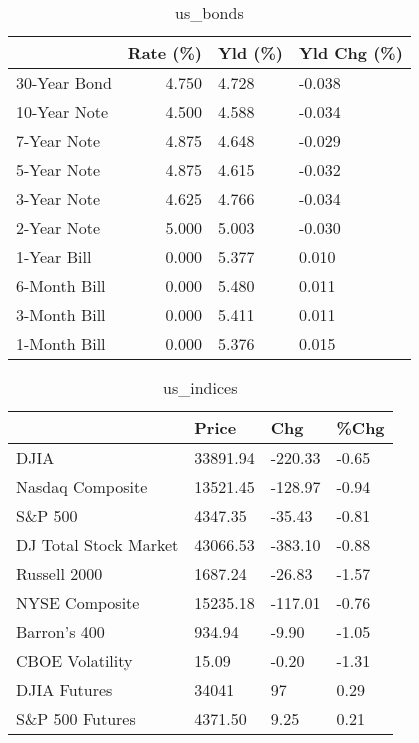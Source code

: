 \documentclass{article}%
\begin{document}
%


\begin{table}[htbp]%
\caption{us\_bonds}%
\centering%
\begin{adjustbox}{width=1\textwidth}%
\begin{tabular}{lrll}
\toprule
             &  Rate (\%) & Yld (\%) & Yld Chg (\%) \\
\midrule
30-Year Bond &     4.750 &   4.728 &      -0.038 \\
10-Year Note &     4.500 &   4.588 &      -0.034 \\
 7-Year Note &     4.875 &   4.648 &      -0.029 \\
 5-Year Note &     4.875 &   4.615 &      -0.032 \\
 3-Year Note &     4.625 &   4.766 &      -0.034 \\
 2-Year Note &     5.000 &   5.003 &      -0.030 \\
 1-Year Bill &     0.000 &   5.377 &       0.010 \\
6-Month Bill &     0.000 &   5.480 &       0.011 \\
3-Month Bill &     0.000 &   5.411 &       0.011 \\
1-Month Bill &     0.000 &   5.376 &       0.015 \\
\bottomrule
\end{tabular}
%
\end{adjustbox}%
\end{table}

%


\begin{table}[htbp]%
\caption{us\_indices}%
\centering%
\begin{adjustbox}{width=1\textwidth}%
\begin{tabular}{llll}
\toprule
                      &    Price &     Chg &  \%Chg \\
\midrule
                 DJIA & 33891.94 & -220.33 & -0.65 \\
     Nasdaq Composite & 13521.45 & -128.97 & -0.94 \\
              S\&P 500 &  4347.35 &  -35.43 & -0.81 \\
DJ Total Stock Market & 43066.53 & -383.10 & -0.88 \\
         Russell 2000 &  1687.24 &  -26.83 & -1.57 \\
       NYSE Composite & 15235.18 & -117.01 & -0.76 \\
         Barron's 400 &   934.94 &   -9.90 & -1.05 \\
      CBOE Volatility &    15.09 &   -0.20 & -1.31 \\
         DJIA Futures &    34041 &      97 &  0.29 \\
      S\&P 500 Futures &  4371.50 &    9.25 &  0.21 \\
\bottomrule
\end{tabular}
%
\end{adjustbox}%
\end{table}
\end{document}
